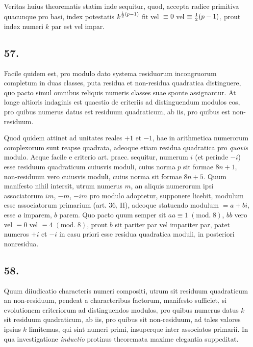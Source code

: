 \documentclass[twoside,12pt]{memoir}
\renewcommand{\pmod}[1]{\;(\textrm{mod.}\;#1)}
\let\oldfrac\frac
\def\frac#1#2{\mathchoice{\tfrac{#1}{#2}}{\oldfrac{#1}{#2}}{\genfrac{}{}{}{2}{#1}{#2\mathstrut}}{\genfrac{}{}{}{3}{#1}{#2\mathstrut}}}
\begin{document}
Veritas huius theorematis statim inde sequitur, quod, accepta radice primitiva quacunque pro basi, index potestatis \(k^{\frac{1}{2}(p-1)}\) fit vel \(\equiv 0\) vel \(\equiv \frac{1}{2}(p-1)\), prout index numeri \(k\) par est vel impar.

\subsection*{57.}
 
Facile quidem est, pro modulo dato systema residuorum incongruorum completum in duas classes, puta residua et non-residua quadratica distinguere, quo pacto simul omnibus reliquis numeris classes suae sponte assignantur. At longe altioris indaginis est quaestio de criteriis ad distinguendum modulos eos, pro quibus numerus datus est residuum quadraticum, ab iis, pro quibus est non-residuum.
 
Quod quidem attinet ad unitates reales \(+1\) et \(-1\), hae in arithmetica numerorum complexorum sunt reapse quadrata, adeoque etiam residua quadratica pro \textit{quovis} modulo. Aeque facile e criterio art. praec. sequitur, numerum \(i\) (et perinde \(-i\)) esse residuum quadraticum cuiusvis moduli, cuius norma \(p\) sit formae \(8 n+1\), non-residuum vero cuiusvis moduli, cuius norma sit formae \(8 n+5\). Quum manifesto nihil intersit, utrum numerus \(m\), an aliquis numerorum ipsi associatorum \(i m\), \(-m\), \(-i m\) pro modulo adoptetur, supponere licebit, modulum esse associatorum primarium (art. 36, II), adeoque statuendo modulum \(=a+b i\), esse \(a\) imparem, \(b\) parem. Quo pacto quum semper sit \(a a \equiv 1\pmod{8}\), \(b b\) vero vel \(\equiv 0\) vel \(\equiv 4\pmod{8}\), prout \(b\) sit pariter par vel impariter par, patet numeros \(+i\) et \(-i\) in casu priori esse residua quadratica moduli, in posteriori nonresidua.\pagebreak%

\subsection*{58.}
 
Quum diiudicatio characteris numeri compositi, utrum sit residuum quadraticum an non-residuum, pendeat a characteribus factorum, manifesto sufficiet, si evolutionem criteriorum ad distinguendos modulos, pro quibus numerus datus \(k\) sit residuum quadraticum, ab iis, pro quibus sit non-residuum, ad tales valores ipsius \(k\) limitemus, qui sint numeri primi, insuperque inter associatos primarii. In qua investigatione \textit{inductio} protinus theoremata maxime elegantia suppeditat.
\end{document}
